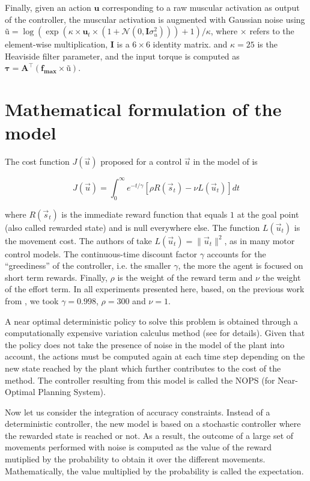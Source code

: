 \documentclass[pdftex,a4paper,11pt]{report}
\begin{document}
Finally, given an action $\textbf{u}$ corresponding to a raw muscular activation as output of the
controller, the muscular activation
is augmented with Gaussian noise using $\textbf{\~{u}} = \log(\exp(\kappa \times \textbf{u}_t \times (1+\mathcal{N}(0,\textbf{I}\sigma_u^2))) + 1) / \kappa$, where $\times$ refers to the element-wise multiplication, $\textbf{I}$ is a $6 \times 6$ identity matrix.
and $\kappa = 25$ is the Heaviside filter parameter, and the input torque 
is computed as $\boldsymbol{\tau} = \textbf{A}^\top ( \textbf{f}_\textbf{max} \times \textbf{\~{u}} )$.

\section{Mathematical formulation of the model}
\label{sec_modelformulation}

The cost function $J(\vec{u})$ proposed for a control $\vec{u}$ in the model of \cite{rigoux12} is

\begin{equation}
\label{eq:criterion}
 J(\vec{u}) = \int_0^{\infty} e^{-t/\gamma} [ \rho R(\vec{s}_t) - \nu L(\vec{u}_t) ] dt
\end{equation}

where $R(\vec{s}_t)$ is the immediate reward function that equals $1$ at the goal point (also called rewarded state) and is null everywhere else. The function $L(\vec{u}_t)$ is the movement cost. The authors of \cite{rigoux12} take $L(\vec{u}_t) = \|\vec{u}_t\|^2$, as in many motor control models. 
The continuous-time discount factor $\gamma$ accounts for the ``greediness'' of the controller, i.e. the smaller $\gamma$, the more the agent is focused on short term rewards.
Finally, $\rho$ is the weight of the reward term and $\nu$ the weight of the effort term.
In all experiments presented here, based, on the previous work from \cite{rigoux12}, we took $\gamma=0.998$, $\rho=300$ and $\nu=1$.

A near optimal deterministic policy to solve this problem is obtained through a computationally expensive variation calculus method (see \cite{rigoux_these} for details).
Given that the policy does not take the presence of noise in the model of the plant into account, 
the actions must be computed again at each time step depending on the new state reached by the plant
which further contributes to the cost of the method.
The controller resulting from this model is called the NOPS (for Near-Optimal Planning System).

Now let us consider the integration of accuracy constraints. Instead of a deterministic controller, the new model is based on a stochastic controller where the rewarded state is reached or not. As a result, the outcome of a large set of movements performed with noise is computed as the value of the reward mutiplied by the probability to obtain it over the different movements. 
Mathematically, the value multiplied by the probability is called the expectation.
\end{document}
